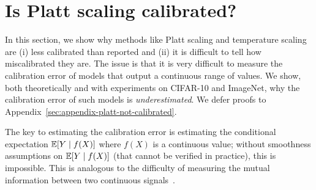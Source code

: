 \section{Is Platt scaling calibrated?}
\label{sec:challenges-measuring}

In this section, we show why methods like Platt scaling and temperature scaling are (i) less calibrated than reported and (ii) it is difficult to tell how miscalibrated they are. The issue is that it is very difficult  to measure the calibration error of models that output a continuous range of values. We show, both theoretically and with experiments on CIFAR-10 and ImageNet, why the calibration error of such models is \emph{underestimated}. We defer proofs to Appendix~\ref{sec:appendix-platt-not-calibrated}.





The key to estimating the calibration error is estimating the conditional expectation $\mathbb{E}[Y \mid f(X)]$ where $f(X)$ is a continuous value; without smoothness assumptions on $\mathbb{E}[Y \mid f(X)]$ (that cannot be verified in practice), this is impossible. This is analogous to the difficulty of measuring the mutual information between two continuous signals~\cite{paninski2003entropy}.

